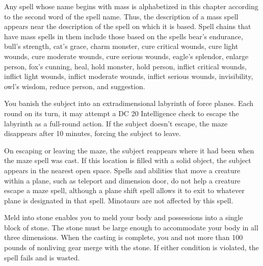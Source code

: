 \begin{multicols}{2}
\begin{small}
\noindent Any spell whose name begins with mass is alphabetized in this chapter according to the second word of the spell name. Thus, the description of a mass spell appears near the description of the spell on which it is based. Spell chains that have mass spells in them include those based on the spells bear's endurance, bull's strength, cat's grace, charm monster, cure critical wounds, cure light wounds, cure moderate wounds, cure serious wounds, eagle's splendor, enlarge person, fox's cunning, heal, hold monster, hold person, inflict critical wounds, inflict light wounds, inflict moderate wounds, inflict serious wounds, invisibility, owl's wisdom, reduce person, and suggestion.

\noindent You banish the subject into an extradimensional labyrinth of force planes. Each round on its turn, it may attempt a DC 20 Intelligence check to escape the labyrinth as a full-round action. If the subject doesn't escape, the maze disappears after 10 minutes, forcing the subject to leave.

\smallskip\noindent On escaping or leaving the maze, the subject reappears where it had been when the maze spell was cast. If this location is filled with a solid object, the subject appears in the nearest open space. Spells and abilities that move a creature within a plane, such as teleport and dimension door, do not help a creature escape a maze spell, although a plane shift spell allows it to exit to whatever plane is designated in that spell. Minotaurs are not affected by this spell.

\noindent Meld into stone enables you to meld your body and possessions into a single block of stone. The stone must be large enough to accommodate your body in all three dimensions. When the casting is complete, you and not more than 100 pounds of nonliving gear merge with the stone. If either condition is violated, the spell fails and is wasted.


\end{small}
\end{multicols}
